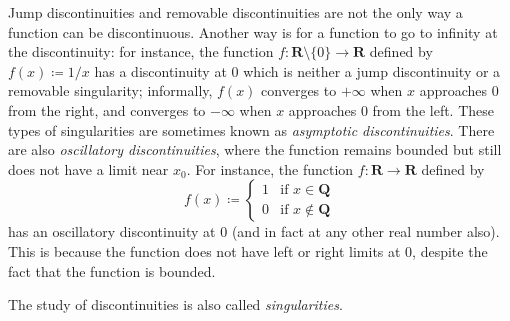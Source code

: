 \begin{remark}\label{9.5.4}
    Jump discontinuities and removable discontinuities are not the only way a function can be discontinuous.
    Another way is for a function to go to infinity at the discontinuity:
    for instance, the function \(f : \mathbf{R} \setminus \{0\} \to \mathbf{R}\) defined by \(f(x) \coloneqq 1 / x\) has a discontinuity at \(0\) which is neither a jump discontinuity or a removable singularity;
    informally, \(f(x)\) converges to \(+\infty\) when \(x\) approaches \(0\) from the right, and converges to \(-\infty\) when \(x\) approaches \(0\) from the left.
    These types of singularities are sometimes known as \emph{asymptotic discontinuities}.
    There are also \emph{oscillatory discontinuities}, where the function remains bounded but still does not have a limit near \(x_0\).
    For instance, the function \(f : \mathbf{R} \to \mathbf{R}\) defined by
    \[
        f(x) \coloneqq \begin{cases}
            1 & \text{if } x \in \mathbf{Q} \\
            0 & \text{if } x \notin \mathbf{Q}
        \end{cases}
    \]
    has an oscillatory discontinuity at \(0\) (and in fact at any other real number also).
    This is because the function does not have left or right limits at \(0\), despite the fact that the function is bounded.
\end{remark}

\begin{note}
    The study of discontinuities is also called \emph{singularities}.
\end{note}